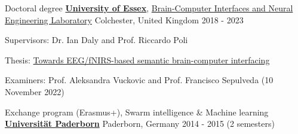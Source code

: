 

\begin{cventries}

  \cventry
    {Doctoral degree} %
    {\href{https://www.essex.ac.uk}{\textbf{University of Essex}}, \href{http://essexbcis.uk}{Brain-Computer Interfaces and Neural Engineering Laboratory}} %
    {Colchester, United Kingdom} %
    {2018 - 2023} %
    {
      \begin{cvitems} %
        \item {Supervisors: Dr. Ian Daly and Prof. Riccardo Poli}
        \item {Thesis: \href{http://milanrybar.cz/semantic-brain-computer-interfacing}{Towards EEG/fNIRS-based semantic brain-computer interfacing}}
        \item {Examiners: Prof. Aleksandra Vuckovic and Prof. Francisco Sepulveda (10 November 2022)}
      \end{cvitems}
    }

  \cventry
{Exchange program (Erasmus+), Swarm intelligence \& Machine learning} %
{\href{http://www.uni-paderborn.de}{\textbf{Universität Paderborn}}} %
{Paderborn, Germany} %
{2014 - 2015 (2 semesters)} %
{
}


\end{cventries}
